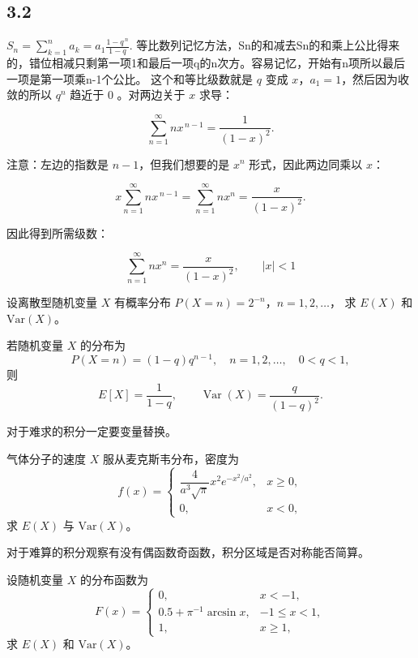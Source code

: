 \subsection*{3.2}
\begin{dxtips}
    $S_n=\sum_{k=1}^{n} a_k = a_1\frac{1-q^{\,n}}{1-q}.$
等比数列记忆方法，Sn的和减去Sn的和乘上公比得来的，错位相减只剩第一项1和最后一项q的n次方。容易记忆，开始有n项所以最后一项是第一项乘n-1个公比。
这个和等比级数就是 $q$ 变成 $x$，$a_1=1$，然后因为收敛的所以 $q^n$ 趋近于 $0$ 。对两边关于 $x$ 求导：

\[
\sum_{n=1}^{\infty} n x^{\,n-1} = \frac{1}{(1-x)^2}.
\]

注意：左边的指数是 $n-1$，但我们想要的是 $x^n$ 形式，因此两边同乘以 $x$：

\[
x \sum_{n=1}^{\infty} n x^{\,n-1}
= \sum_{n=1}^{\infty} n x^n
= \frac{x}{(1-x)^2}.
\]

因此得到所需级数：

\[
\boxed{
\sum_{n=1}^{\infty} n x^n = \frac{x}{(1-x)^2},\qquad |x|<1
}
\]
\end{dxtips}
\begin{homework}[3.5]
设离散型随机变量 $X$ 有概率分布 $P(X=n)=2^{-n}$，$n=1,2,\ldots$，
求 $E(X)$ 和 $\mathrm{Var}(X)$。
\end{homework}
\begin{dxtips}
    若随机变量 $X$ 的分布为
\[
P(X=n)=(1-q)q^{n-1},\quad n=1,2,\dots,\quad 0<q<1,
\]
则
\[
E[X]=\frac{1}{1-q},\qquad
\operatorname{Var}(X)=\frac{q}{(1-q)^2}.

\]
\end{dxtips}
\begin{dxtips}
    对于难求的积分一定要变量替换。
\end{dxtips}
\begin{homework}[3.12]
气体分子的速度 $X$ 服从麦克斯韦分布，密度为
\[
f(x)=
\begin{cases}
\dfrac{4}{a^3\sqrt{\pi}}x^2 e^{-x^2/a^2}, & x\ge0,\\
0,& x<0,
\end{cases}
\]
求 $E(X)$ 与 $\mathrm{Var}(X)$。
\end{homework}
\begin{dxtips}
    对于难算的积分观察有没有偶函数奇函数，积分区域是否对称能否简算。
\end{dxtips}
\begin{homework}[3.14]
设随机变量 $X$ 的分布函数为
\[
F(x)=
\begin{cases}
0,& x<-1,\\
0.5+\pi^{-1}\arcsin x,& -1\le x<1,\\
1,& x\ge1,
\end{cases}
\]
求 $E(X)$ 和 $\mathrm{Var}(X)$。
\end{homework}

